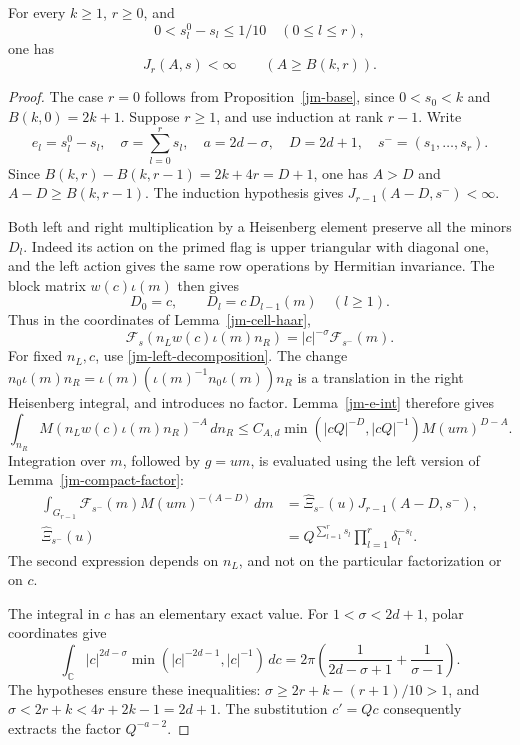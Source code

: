 \begin{theorem}\label{jm-group-integral}
For every \(k\geq1\), \(r\geq0\), and
\[
                0<s_l^0-s_l\leq1/10\quad(0\leq l\leq r),
\]
one has
\begin{equation}\label{jm-AAt}
                       J_r(A,s)<\infty
                                   \qquad(A\geq B(k,r)).
\end{equation}
\end{theorem}

\begin{proof}
The case \(r=0\) follows from Proposition~\ref{jm-base},
since \(0<s_0<k\) and \(B(k,0)=2k+1\).
Suppose \(r\geq1\), and use induction at rank \(r-1\).
Write
\[
 e_l=s_l^0-s_l,\quad
 \sigma=\sum_{l=0}^{r}s_l,\quad
 a=2d-\sigma,\quad D=2d+1,\quad s^-=(s_1,\ldots,s_r).
\]
Since
\(B(k,r)-B(k,r-1)=2k+4r=D+1\), one has
\(A>D\) and \(A-D\geq B(k,r-1)\).
The induction hypothesis gives
\(J_{r-1}(A-D,s^-)<\infty\).

Both left and right multiplication by a Heisenberg element
preserve all the minors \(D_l\).
Indeed its action on the primed flag is upper triangular
with diagonal one, and the left action gives the same row
operations by Hermitian invariance.
The block matrix \(w(c)\iota(m)\) then gives
\[
 D_0=c,\qquad D_l=c\,D_{l-1}(m)\quad(l\geq1).
\]
Thus in the coordinates of Lemma~\ref{jm-cell-haar},
\[
 \mathcal F_s(n_Lw(c)\iota(m)n_R)
                  =|c|^{-\sigma}\mathcal F_{s^-}(m).
\]
For fixed \(n_L,c\), use \eqref{jm-left-decomposition}.
The change
\(n_0\iota(m)n_R=\iota(m)(\iota(m)^{-1}n_0\iota(m))n_R\)
is a translation in the right Heisenberg integral, and
introduces no factor.  Lemma~\ref{jm-e-int} therefore gives
\[
 \int_{n_R}M(n_Lw(c)\iota(m)n_R)^{-A}\,dn_R
 \leq C_{A,d}\min(|cQ|^{-D},|cQ|^{-1})M(um)^{D-A}.
\]
Integration over \(m\), followed by \(g=um\), is evaluated
using the left version of Lemma~\ref{jm-compact-factor}:
\begin{align*}
 \int_{G_{r-1}}\mathcal F_{s^-}(m)M(um)^{-(A-D)}\,dm
       &=\widehat\Xi_{s^-}(u)J_{r-1}(A-D,s^-),\\
 \widehat\Xi_{s^-}(u)
       &=Q^{\sum_{l=1}^{r}s_l}
                             \prod_{l=1}^{r}\delta_l^{-s_l}.
\end{align*}
The second expression depends on \(n_L\), and not on the
particular factorization or on \(c\).

The integral in \(c\) has an elementary exact value.
For \(1<\sigma<2d+1\), polar coordinates give
\[
 \int_{\mathbb C}|c|^{2d-\sigma}
             \min(|c|^{-2d-1},|c|^{-1})\,dc
          =2\pi\left(\frac{1}{2d-\sigma+1}
                                  +\frac{1}{\sigma-1}\right).
\]
The hypotheses ensure these inequalities:
\(\sigma\geq2r+k-(r+1)/10>1\), and
\(\sigma<2r+k<4r+2k-1=2d+1\).
The substitution \(c'=Qc\) consequently extracts the
factor \(Q^{-a-2}\).


\end{proof}
